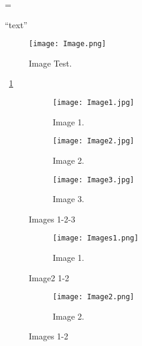 
\emergencystretch=\maxdimen


``text''


\begin{figure}[h!]
	\centering
	\texttt{[image: Image.png]}
	\caption{Image Test.}
	\label{fig:image_test}
\end{figure}


\figurename{~\ref{fig:image_test}}


\begin{figure}[h]
	\centering
	\begin{subfigure}{1\textwidth}
	\texttt{[image: Image1.jpg]}
	\caption{Image 1.}
	\label{fig:image1}
	\end{subfigure}
	\begin{subfigure}{1\textwidth}
		\texttt{[image: Image2.jpg]}
		\caption{Image 2.}
		\label{fig:image2}
	\end{subfigure}
	\begin{subfigure}{1\textwidth}
		\texttt{[image: Image3.jpg]}
		\caption{Image 3.}
		\label{fig:image3}
	\end{subfigure}
	\caption{Images 1-2-3}
\end{figure}


\usepackage[export]{adjustbox}


\begin{figure}[h]
	\centering
	\begin{subfigure}[b]{0.5\textwidth}
		\texttt{[image: Images1.png]}
		\caption{Image 1.}
		\label{fig:image1}
	\end{subfigure}
	\caption{Image2 1-2}
\end{figure}
\begin{figure}\ContinuedFloat[h]
	\centering
	\begin{subfigure}[b]{0.5\textwidth}
		\texttt{[image: Image2.png]}
		\caption{Image 2.}
		\label{fig:image2}
	\end{subfigure}
	\caption{Images 1-2}
\end{figure}


